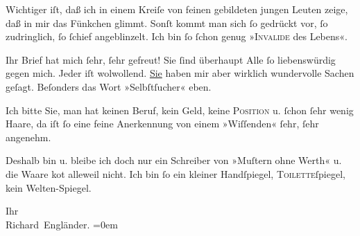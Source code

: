 \pstart
           Wichtiger iſt, daß ich in einem Kreiſe von feinen gebildeten jungen Leuten zeige, daß
                   in mir das Fünkchen glimmt. Sonſt kommt man sich ſo gedrückt vor, ſo
               zudringlich, ſo ſchief angeblinzelt. Ich bin ſo ſchon genug »\textsc{Invalide} des Lebens«.\pend
           
\pstart
           Ihr Brief hat mich ſehr, ſehr gefreut! {\pb} Sie ſind überhaupt Alle ſo liebenswürdig gegen mich. Jeder iſt wolwollend. \uline{Sie} haben mir aber wirklich wundervolle Sachen geſagt.
               Beſonders das Wort »Selbſtſucher« eben.\pend
           
\pstart
           Ich bitte Sie, man hat keinen Beruf, kein Geld, keine \textsc{Position} u. ſchon ſehr wenig Haare, da iſt ſo eine feine Anerkennung von
               einem »Wiſſenden« ſehr, ſehr angenehm.\pend
           
\pstart
           Deshalb bin u. bleibe ich doch nur ein Schreiber von »Muſtern ohne Werth« u. die
               Waare ko{\geminationm}t alleweil nicht. Ich bin ſo ein kleiner
               Handſpiegel, \textsc{Toilette}ſpiegel, kein  Welten-Spiegel.\pend
           
\pstart
           Ihr{\\[\baselineskip]}\spacefill\mbox{Richard Engländer.}\pend
           \leftskip=0em{}\endnumbering{}  
      